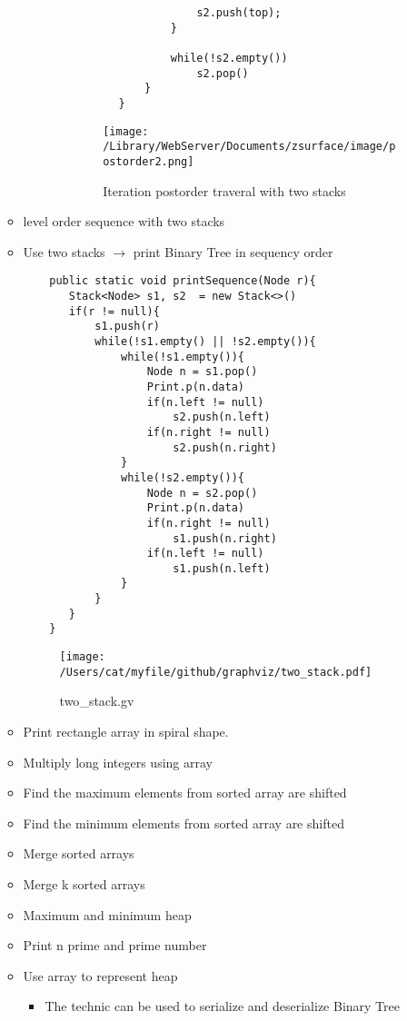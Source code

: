 \documentclass{article}
\newcommand{\arr}{\rightarrow}
\begin{document}
\begin{enumerate}
\begin{itemize}
\begin{itemize}
\begin{itemize}
\begin{verbatim}
                    s2.push(top);
                }

                while(!s2.empty())
                    s2.pop()
            }
        }
        \end{verbatim} 

        \begin{figure}
        \centering
        \texttt{[image: /Library/WebServer/Documents/zsurface/image/postorder2.png]}
        \caption{Iteration postorder traveral with two stacks}
        \end{figure} 

        \end{itemize}
\end{itemize} 

\item[] level order sequence with two stacks
\item Use two stacks $\arr $ print Binary Tree in sequency order 
     \begin{verbatim}
    public static void printSequence(Node r){
       Stack<Node> s1, s2  = new Stack<>()  
       if(r != null){ 
           s1.push(r)
           while(!s1.empty() || !s2.empty()){
               while(!s1.empty()){
                   Node n = s1.pop()
                   Print.p(n.data)
                   if(n.left != null)
                       s2.push(n.left)
                   if(n.right != null)
                       s2.push(n.right)
               }
               while(!s2.empty()){
                   Node n = s2.pop()
                   Print.p(n.data)
                   if(n.right != null)
                       s1.push(n.right)
                   if(n.left != null)
                       s1.push(n.left)
               }
           }
       }
    }
\end{verbatim} 
\pagebreak
\begin{figure}
\centering
\texttt{[image: /Users/cat/myfile/github/graphviz/two\_stack.pdf]}
\caption{two{\_}stack.gv}
\end{figure} 

\item Print rectangle array in spiral shape.
\item Multiply long integers using array 
\item Find the maximum elements from sorted array are shifted
\item Find the minimum elements from sorted array are shifted
\item Merge sorted arrays
\item Merge k sorted arrays
\item Maximum and minimum heap
\item Print n prime and prime number 
\item Use array to represent heap
    \begin{itemize}
     \item The technic can be used to serialize and deserialize Binary Tree
        \end{itemize}


\end{itemize}
\end{enumerate}
\end{document}

